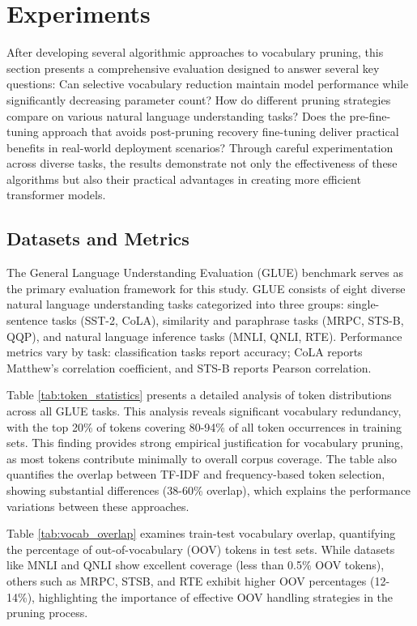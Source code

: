 \documentclass[twocolumn]{article}
\begin{document}


\section{Experiments}
After developing several algorithmic approaches to vocabulary pruning, this section presents a comprehensive evaluation designed to answer several key questions: Can selective vocabulary reduction maintain model performance while significantly decreasing parameter count? How do different pruning strategies compare on various natural language understanding tasks? Does the pre-fine-tuning approach that avoids post-pruning recovery fine-tuning deliver practical benefits in real-world deployment scenarios? Through careful experimentation across diverse tasks, the results demonstrate not only the effectiveness of these algorithms but also their practical advantages in creating more efficient transformer models.

\subsection{Datasets and Metrics}
The General Language Understanding Evaluation (GLUE) benchmark serves as the primary evaluation framework for this study. GLUE consists of eight diverse natural language understanding tasks categorized into three groups: single-sentence tasks (SST-2, CoLA), similarity and paraphrase tasks (MRPC, STS-B, QQP), and natural language inference tasks (MNLI, QNLI, RTE). Performance metrics vary by task: classification tasks report accuracy; CoLA reports Matthew's correlation coefficient, and STS-B reports Pearson correlation.

Table \ref{tab:token_statistics} presents a detailed analysis of token distributions across all GLUE tasks. This analysis reveals significant vocabulary redundancy, with the top 20\% of tokens covering 80-94\% of all token occurrences in training sets. This finding provides strong empirical justification for vocabulary pruning, as most tokens contribute minimally to overall corpus coverage. The table also quantifies the overlap between TF-IDF and frequency-based token selection, showing substantial differences (38-60\% overlap), which explains the performance variations between these approaches.

Table \ref{tab:vocab_overlap} examines train-test vocabulary overlap, quantifying the percentage of out-of-vocabulary (OOV) tokens in test sets. While datasets like MNLI and QNLI show excellent coverage (less than 0.5\% OOV tokens), others such as MRPC, STSB, and RTE exhibit higher OOV percentages (12-14\%), highlighting the importance of effective OOV handling strategies in the pruning process. 
\end{document}
